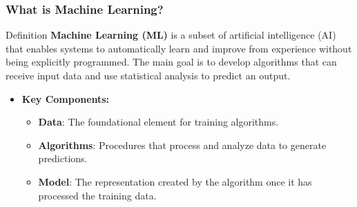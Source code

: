 \documentclass{beamer}
\begin{document}
\begin{frame}[fragile]
    \frametitle{What is Machine Learning?}
    \begin{block}{Definition}
        \textbf{Machine Learning (ML)} is a subset of artificial intelligence (AI) that enables systems to automatically learn and improve from experience without being explicitly programmed.
        The main goal is to develop algorithms that can receive input data and use statistical analysis to predict an output.
    \end{block}
    
    \begin{itemize}
        \item \textbf{Key Components:}
        \begin{itemize}
            \item \textbf{Data}: The foundational element for training algorithms.
            \item \textbf{Algorithms}: Procedures that process and analyze data to generate predictions.
            \item \textbf{Model}: The representation created by the algorithm once it has processed the training data.
        \end{itemize}
    \end{itemize}
\end{frame}
\end{document}
